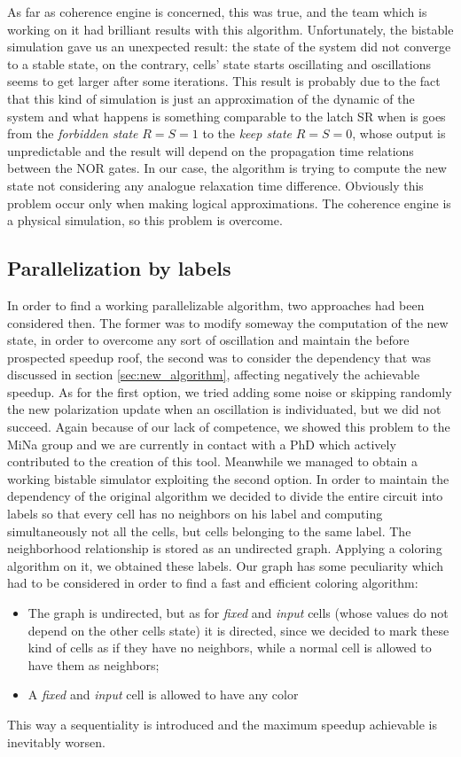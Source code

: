 As far as coherence engine is concerned, this was true, and the team which is working on it had brilliant results with this algorithm. Unfortunately, the bistable simulation gave us an unexpected result: the state of the system did not converge to a stable state, on the contrary, cells' state starts oscillating and oscillations seems to get larger after some iterations. This result is probably due to the fact that this kind of simulation is just an approximation of the dynamic of the system and what happens is something comparable to the latch SR when is goes from the \textit{forbidden state} $R=S=1$ to the \textit{keep state} $R=S=0$, whose output is unpredictable and the result will depend on the propagation time relations between the NOR gates. In our case, the algorithm is trying to compute the new state not considering any analogue relaxation time difference. Obviously this problem occur only when making logical approximations. The coherence engine is a physical simulation, so this problem is overcome.

\subsection{Parallelization by labels}
In order to find a working parallelizable algorithm, two approaches had been considered then. The former was to modify someway the computation of the new state, in order to overcome any sort of oscillation and maintain the before prospected speedup roof, the second was to consider the dependency that was discussed in section \ref{sec:new_algorithm}, affecting negatively the achievable speedup.
As for the first option, we tried adding some noise or skipping randomly the new polarization update when an oscillation is individuated, but we did not succeed. Again because of our lack of competence, we showed this problem to the MiNa group and we are currently in contact with a PhD which actively contributed to the creation of this tool. Meanwhile we managed to obtain a working bistable simulator exploiting the second option.\newline
In order to maintain the dependency of the original algorithm we decided to divide the entire circuit into labels so that every cell has no neighbors on his label and computing simultaneously not all the cells, but cells belonging to the same label.
The neighborhood relationship is stored as an undirected graph. Applying a coloring algorithm on it, we obtained these labels. Our graph has some peculiarity which had to be considered in order to find a fast and efficient coloring algorithm:
\begin{itemize}
	\item The graph is undirected, but as for \textit{fixed} and \textit{input} cells (whose values do not depend on the other cells state) it is directed, since we decided to mark these kind of cells as if they have no neighbors, while a normal cell is allowed to have them as neighbors;
	\item A \textit{fixed} and \textit{input} cell is allowed to have any color
\end{itemize}
This way a sequentiality is introduced and the maximum speedup achievable is inevitably worsen.

